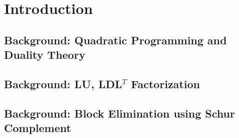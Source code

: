 \chapter{Introduction}\label{chapter:Introduction}



\section{Background: Quadratic Programming and Duality Theory}
\section{Background: LU, LDL\(^{T}\) Factorization}
\section{Background: Block Elimination using Schur Complement}
